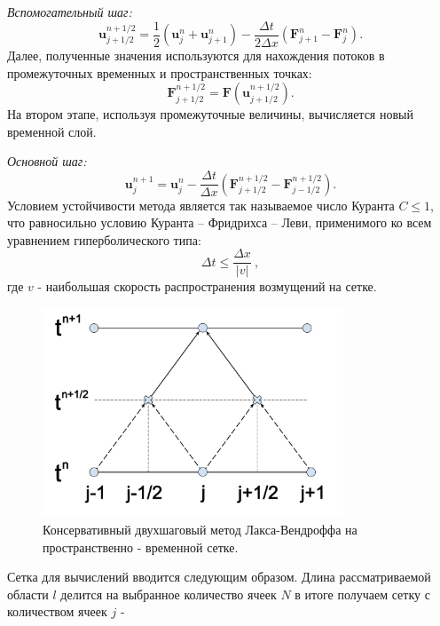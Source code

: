 \documentclass[a4paper]{article}
\begin{document}
	\textit{Вспомогательный шаг:}
	\begin{equation}\label{LW_helper}
	\mathbf{u}_{j+1/2}^{n+1/2} = \frac{1}{2} \left(\mathbf{u}_{j}^{n} + \mathbf{u}_{j+1}^{n}\right)
	- \frac{\Delta t}{2 \Delta x}
	\left(\mathbf{F}_{j+1}^{n} - \mathbf{F}_{j}^{n}\right) .
	\end{equation}
	Далее, полученные значения используются для нахождения потоков в промежуточных временных и пространственных точках:
	\begin{equation}\label{LW_flow}
	\mathbf{F}_{j+1/2}^{n+1/2} = \mathbf{F} \left( \mathbf{u}_{j+1/2}^{n+1/2} \right).
	\end{equation}
	На втором этапе, используя промежуточные величины, вычисляется новый временной слой.
	
	\textit{Основной шаг:}
	\begin{equation}\label{LW_main}
	\mathbf{u}_{j}^{n+1} = \mathbf{u}_{j}^{n} - \frac{\Delta t}{\Delta x} \left(
	\mathbf{F}_{j+1/2}^{n+1/2} - \mathbf{F}_{j-1/2}^{n+1/2}				 \right) .
	\end{equation}
	Условием устойчивости метода является так называемое число Куранта $C \leqslant 1$, что равносильно условию Куранта -- Фридрихса -- Леви, применимого ко всем уравнением гиперболического типа: %
	\begin{equation}
	\Delta t \leqslant \dfrac{\Delta x}{|v|} \:,
	\end{equation}
	где $v$ - наибольшая скорость распространения возмущений на сетке.
	\begin{figure}
		\centering
		\includegraphics[width=0.8\textwidth]{Lax-Wendroff.pdf}
		\caption{Консервативный двухшаговый метод Лакса-Вендроффа на пространственно - временной сетке.}
		\label{LW_picture}
	\end{figure}
	Сетка для вычислений вводится следующим образом. Длина рассматриваемой области $l$ делится на выбранное количество ячеек $N$ в итоге получаем сетку с количеством ячеек $j$ - 
\end{document}
